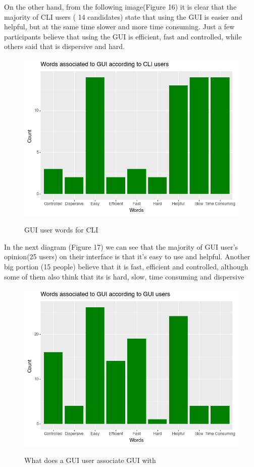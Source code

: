 \documentclass[]{report}
\begin{document}
	On the other hand, from the following image(Figure 16) it is clear that the majority of CLI users ( 14 candidates) state that using the GUI is easier and helpful, but at the same time slower and more time consuming. Just a few participants believe that using the GUI is efficient, fast and controlled, while others said that is dispersive and hard.
	\begin{figure}[H]
		\centering
		\includegraphics[width=0.75\linewidth]{WordsGUIfromCLI}\\
		\caption{GUI user words for CLI}
		\label{fig: 17}
	\end{figure}
	
	In the next diagram (Figure 17) we can see that the majority of GUI user's opinion(25 users) on their interface is that it's easy to use and helpful. Another big portion (15 people) believe that it is fast, efficient and controlled, although some of them also think that its is hard, slow, time consuming and dispersive
	
	\begin{figure}[H]
		\centering
		\includegraphics[width=0.75\linewidth]{WordsGUIfromGUI}\\
		\caption{What does a GUI user associate GUI with}
		\label{fig: 16}
	\end{figure}
	
\end{document}
